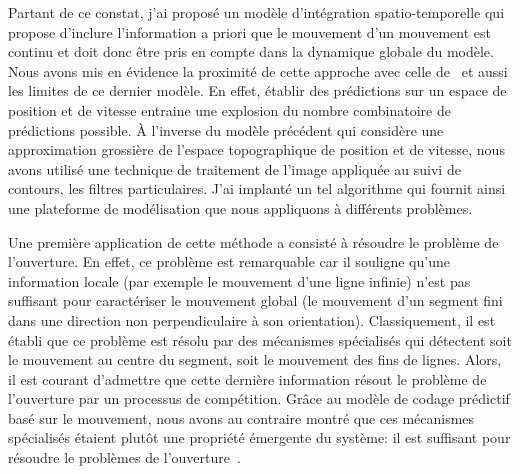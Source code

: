 Partant de ce constat, j'ai proposé un modèle d'intégration spatio-temporelle qui propose d'inclure l'information a priori que le mouvement d'un mouvement est continu et doit donc être pris en compte dans la dynamique globale du modèle. Nous avons mis en évidence la proximité de cette approche avec celle de~\citet{Burgi00} et aussi les limites de ce dernier modèle. En effet, établir des prédictions sur un espace de position et de vitesse entraine une explosion du nombre combinatoire de prédictions possible. À l'inverse du modèle précédent qui considère une approximation grossière de l'espace topographique de position et de vitesse, nous avons utilisé une technique de traitement de l'image appliquée au suivi de contours, les filtres particulaires. J'ai implanté un tel algorithme qui fournit ainsi une plateforme de modélisation que nous appliquons à différents problèmes.

Une première application de cette méthode a consisté à résoudre le problème de l'ouverture. En effet, ce problème est remarquable car il souligne qu'une information locale (par exemple le mouvement d'une ligne infinie) n'est pas suffisant pour caractériser le mouvement global (le mouvement d'un segment fini dans une direction non perpendiculaire à son orientation). Classiquement, il est établi que ce problème est résolu par des mécanismes spécialisés qui détectent soit le mouvement au centre du segment, soit le mouvement des fins de lignes. Alors, il est courant d'admettre que cette dernière information résout le problème de l'ouverture par un processus de compétition. Grâce au modèle de codage prédictif basé sur le mouvement, nous avons au contraire montré que ces mécanismes spécialisés étaient plutôt une propriété émergente du système: il est suffisant pour résoudre le problèmes de l'ouverture~\citep{Perrinet12pred}. %

